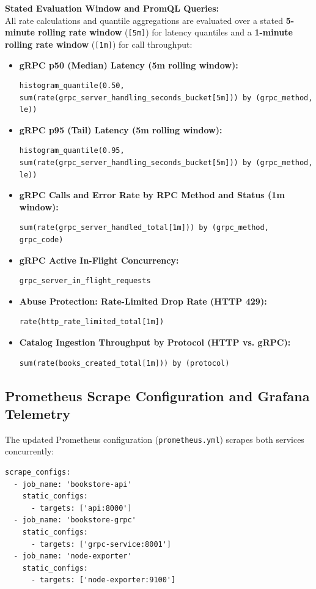 \documentclass[11pt,a4paper]{article}
\begin{document}
\noindent\textbf{Stated Evaluation Window and PromQL Queries:}\\
All rate calculations and quantile aggregations are evaluated over a stated \textbf{5-minute rolling rate window} (\texttt{[5m]}) for latency quantiles and a \textbf{1-minute rolling rate window} (\texttt{[1m]}) for call throughput:
\begin{itemize}\setlength{\itemsep}{1pt}
    \item \textbf{gRPC p50 (Median) Latency (5m rolling window):}
    \begin{lstlisting}[basicstyle=\ttfamily\scriptsize]
histogram_quantile(0.50, sum(rate(grpc_server_handling_seconds_bucket[5m])) by (grpc_method, le))
    \end{lstlisting}
    \item \textbf{gRPC p95 (Tail) Latency (5m rolling window):}
    \begin{lstlisting}[basicstyle=\ttfamily\scriptsize]
histogram_quantile(0.95, sum(rate(grpc_server_handling_seconds_bucket[5m])) by (grpc_method, le))
    \end{lstlisting}
    \item \textbf{gRPC Calls and Error Rate by RPC Method and Status (1m window):}
    \begin{lstlisting}[basicstyle=\ttfamily\scriptsize]
sum(rate(grpc_server_handled_total[1m])) by (grpc_method, grpc_code)
    \end{lstlisting}
    \item \textbf{gRPC Active In-Flight Concurrency:}
    \begin{lstlisting}[basicstyle=\ttfamily\scriptsize]
grpc_server_in_flight_requests
    \end{lstlisting}
    \item \textbf{Abuse Protection: Rate-Limited Drop Rate (HTTP 429):}
    \begin{lstlisting}[basicstyle=\ttfamily\scriptsize]
rate(http_rate_limited_total[1m])
    \end{lstlisting}
    \item \textbf{Catalog Ingestion Throughput by Protocol (HTTP vs. gRPC):}
    \begin{lstlisting}[basicstyle=\ttfamily\scriptsize]
sum(rate(books_created_total[1m])) by (protocol)
    \end{lstlisting}
\end{itemize}

\subsection{Prometheus Scrape Configuration and Grafana Telemetry}
The updated Prometheus configuration (\texttt{prometheus.yml}) scrapes both services concurrently:
\begin{lstlisting}[basicstyle=\ttfamily\scriptsize]
scrape_configs:
  - job_name: 'bookstore-api'
    static_configs:
      - targets: ['api:8000']
  - job_name: 'bookstore-grpc'
    static_configs:
      - targets: ['grpc-service:8001']
  - job_name: 'node-exporter'
    static_configs:
      - targets: ['node-exporter:9100']
\end{lstlisting}
\end{document}
